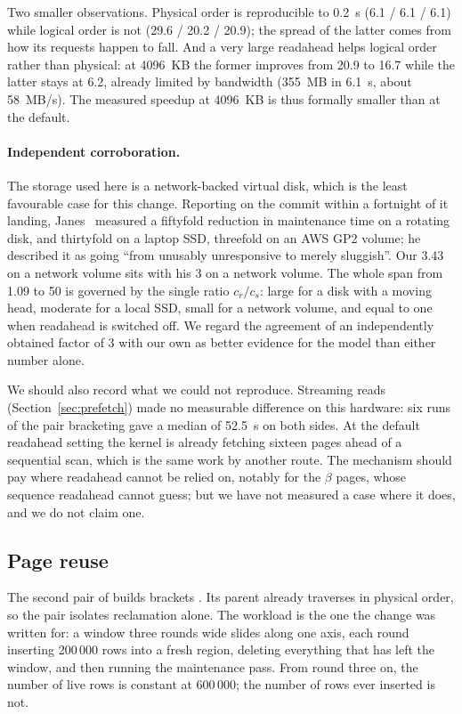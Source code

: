 Two smaller observations. Physical order is reproducible to 0.2~s
(6.1 / 6.1 / 6.1) while logical order is not (29.6 / 20.2 / 20.9); the spread of
the latter comes from how its requests happen to fall. And a very large
readahead helps logical order rather than physical: at 4096~KB the former
improves from 20.9 to 16.7 while the latter stays at 6.2, already limited by
bandwidth (355~MB in 6.1~s, about 58~MB/s). The measured speedup at 4096~KB is
thus formally smaller than at the default.

\paragraph{Independent corroboration.} The storage used here is a network-backed
virtual disk, which is the least favourable case for this change. Reporting on
the commit within a fortnight of it landing, Janes~\cite{janes2019gistvacuum}
measured a fiftyfold reduction in maintenance time on a rotating disk, and
thirtyfold on a laptop SSD, threefold on an AWS GP2 volume; he described it as
going ``from unusably unresponsive to merely sluggish''. Our 3.43 on a network
volume sits with his 3 on a network volume. The whole span from 1.09 to 50 is
governed by the single ratio $c_r/c_s$: large for a disk with a moving head,
moderate for a local SSD, small for a network volume, and equal to one when
readahead is switched off. We regard the agreement of an independently obtained
factor of 3 with our own as better evidence for the model than either number
alone.

\begin{sloppypar}
We should also record what we could not reproduce. Streaming reads
(Section~\ref{sec:prefetch}) made no measurable difference on this hardware:
six runs of the pair bracketing  gave a median of 52.5~s on
both sides. At the default readahead setting the kernel is already fetching
sixteen pages ahead of a sequential scan, which is the same work by another
route.
The mechanism should pay where readahead cannot be relied on, notably for the
$\beta$ pages, whose sequence readahead cannot guess; but we have not measured
a case where it does, and we do not claim one.
\end{sloppypar}

\subsection{Page reuse}

The second pair of builds brackets . Its parent already
traverses in physical order, so the pair isolates reclamation alone. The
workload is the one the change was written for: a window three rounds wide
slides along one axis, each round inserting 200\,000 rows into a fresh region,
deleting everything that has left the window, and then running the maintenance
pass. From round three on, the number of live rows is constant at 600\,000; the
number of rows ever inserted is not.

